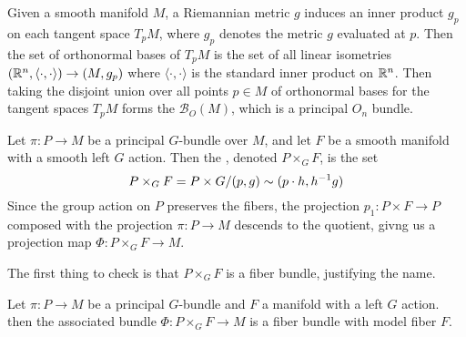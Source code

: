 %
\begin{exmp}
Given a smooth manifold $M$, a Riemannian metric $g$ induces an inner product
$g_p$ on each tangent space $T_pM$, where $g_p$ denotes the metric $g$ evaluated
at $p$. Then the set of orthonormal bases of $T_pM$ is the
set of all linear isometries $(\mathbb{R}^n, \langle\cdot,\cdot\rangle) \to (M, g_p)$
where $\langle\cdot,\cdot\rangle$ is the standard inner product on $\mathbb{R}^n$.
Then taking the disjoint union over all points $p\in M$ of orthonormal bases
for the tangent spaces $T_pM$ forms the 
$\mathcal{B}_O(M)$, which is a principal $O_n$ bundle.
\end{exmp}
%
\begin{defn}
Let $\pi : P \to M$ be a principal $G$-bundle over $M$, and let $F$ be a
smooth manifold with a smooth left $G$ action. Then the , denoted $P \times_G F$, is the set
\[
P \times_G F = P \times G / (p,g) \sim (p\cdot h, h^{-1} g)
\]
Since the group action on $P$ preserves the fibers, the projection
$p_1 : P \times F \to P$ composed with the projection $\pi : P \to M$
descends to the quotient, givng us a projection map
$\Phi : P \times_G F \to M$.
\end{defn}
%
The first thing to check is that $P \times_G F$ is a fiber bundle, justifying
the name.
%
\begin{prop}
Let $\pi : P \to M$ be a principal $G$-bundle and $F$ a manifold with a left $G$ action.
then the associated bundle $ \Phi : P \times_G F \to M$ is a fiber bundle with
model fiber $F$.
\end{prop}
%

